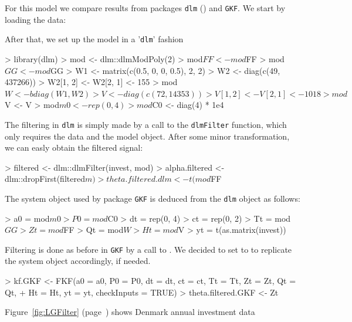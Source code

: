 \documentclass{article}
\newcommand{\GKF}{\texttt{GKF}\xspace}
\begin{document}
For this model we compare results from packages \texttt{dlm} (\cite{petris2010dlm}) and
\GKF. We start by loading the data:
\begin{Schunk}
\end{Schunk}
After that, we set up the model in a '\texttt{dlm}' fashion
\begin{Schunk}
\begin{Sinput}
> library(dlm)
> mod <- dlm::dlmModPoly(2)
> mod$FF <- mod$FF %
> mod$GG <- mod$GG %
> W1 <- matrix(c(0.5, 0, 0, 0.5), 2, 2)
> W2 <- diag(c(49, 437266))
> W2[1, 2] <- W2[2, 1] <- 155
> mod$W <- bdiag(W1, W2)
> V <- diag(c(72, 14353))
> V[1, 2] <- V[2, 1] <- 1018
> mod$V <- V
> mod$m0 <- rep(0, 4)
> mod$C0 <- diag(4) * 1e4
\end{Sinput}
\end{Schunk}
The filtering in \texttt{dlm} is simply made by a call to the \texttt{dlmFilter} function,
which only requires the data and the model object. After some minor transformation, we can
easly obtain the filtered signal:
\begin{Schunk}
\begin{Sinput}
> filtered <- dlm::dlmFilter(invest, mod)
> alpha.filtered <- dlm::dropFirst(filtered$m)
> theta.filtered.dlm <- t(mod$FF %
\end{Sinput}
\end{Schunk}
The system object used by package \GKF is deduced from the \texttt{dlm} object as follows:
\begin{Schunk}
\begin{Sinput}
> a0 = mod$m0
> P0 = mod$C0
> dt = rep(0, 4)
> ct = rep(0, 2)
> Tt = mod$GG
> Zt = mod$FF
> Qt = mod$W
> Ht = mod$V
> yt = t(as.matrix(invest))
\end{Sinput}
\end{Schunk}
Filtering is done as before in \GKF by a call to \verb@FKF@. We decided to set
\verb@checkInputs@ to \verb@TRUE@ to replicate the system object accordingly, if needed.
\begin{Schunk}
\begin{Sinput}
> kf.GKF <- FKF(a0 = a0, P0 = P0, dt = dt, ct = ct, Tt = Tt, Zt = Zt, Qt = Qt,
+               Ht = Ht, yt = yt, checkInputs = TRUE)
> theta.filtered.GKF <- Zt %
\end{Sinput}
\end{Schunk}
Figure~\ref{fig:LGFilter} (page~\pageref{fig:LGFilter}) shows Denmark annual investment data
\end{document}
